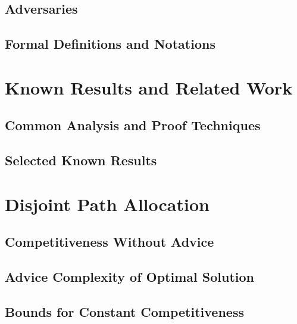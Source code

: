 \documentclass[12pt,a4paper]{report}
\begin{document}
\section{Adversaries}
\label{section:online-graph}

\section{Formal Definitions and Notations}
\label{section:definitions}


\chapter{Known Results and Related Work}
\label{chapter:known}

\section{Common Analysis and Proof Techniques}
\label{section:techniques}

\section{Selected Known Results}
\label{section:known-results}


\chapter{Disjoint Path Allocation}
\label{chapter:dpa}

\section{Competitiveness Without Advice}
\label{section:dpa-no-advice}

\section{Advice Complexity of Optimal Solution}
\label{section:dpa-optimal}

%
\section{Bounds for Constant Competitiveness}
\label{section:dpa-constant-compet}

\end{document}
